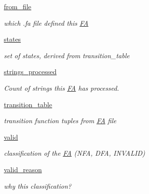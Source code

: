 \begin{DoxyCompactItemize}
\mbox{\hyperlink{classfinite__automaton_1_1_f_a_a584285fe507e7e46c15601255510836e}{from\+\_\+file}}
\begin{DoxyCompactList}\small\item\em which .fa file defined this \mbox{\hyperlink{classfinite__automaton_1_1_f_a}{FA}} \end{DoxyCompactList}\item 
\mbox{\label{classfinite__automaton_1_1_f_a_aa19be6305a5a4485e1e70de70ed7d677}} 
\mbox{\hyperlink{classfinite__automaton_1_1_f_a_aa19be6305a5a4485e1e70de70ed7d677}{states}}
\begin{DoxyCompactList}\small\item\em set of states, derived from transition\+\_\+table \end{DoxyCompactList}\item 
\mbox{\label{classfinite__automaton_1_1_f_a_a05042b6f922079000c39f929e1056db6}} 
\mbox{\hyperlink{classfinite__automaton_1_1_f_a_a05042b6f922079000c39f929e1056db6}{strings\+\_\+processed}}
\begin{DoxyCompactList}\small\item\em Count of strings this \mbox{\hyperlink{classfinite__automaton_1_1_f_a}{FA}} has processed. \end{DoxyCompactList}\item 
\mbox{\label{classfinite__automaton_1_1_f_a_a267e15dcf00b71013391e54693d6ba80}} 
\mbox{\hyperlink{classfinite__automaton_1_1_f_a_a267e15dcf00b71013391e54693d6ba80}{transition\+\_\+table}}
\begin{DoxyCompactList}\small\item\em transition function tuples from \mbox{\hyperlink{classfinite__automaton_1_1_f_a}{FA}} file \end{DoxyCompactList}\item 
\mbox{\label{classfinite__automaton_1_1_f_a_a51646327ac0a3287c4b08e4d28b66f35}} 
\mbox{\hyperlink{classfinite__automaton_1_1_f_a_a51646327ac0a3287c4b08e4d28b66f35}{valid}}
\begin{DoxyCompactList}\small\item\em classification of the \mbox{\hyperlink{classfinite__automaton_1_1_f_a}{FA}} (N\+FA, D\+FA, I\+N\+V\+A\+L\+ID) \end{DoxyCompactList}\item 
\mbox{\label{classfinite__automaton_1_1_f_a_a491206290c886a4aa57ec50978f79300}} 
\mbox{\hyperlink{classfinite__automaton_1_1_f_a_a491206290c886a4aa57ec50978f79300}{valid\+\_\+reason}}
\begin{DoxyCompactList}\small\item\em why this classification? \end{DoxyCompactList}\end{DoxyCompactItemize}



